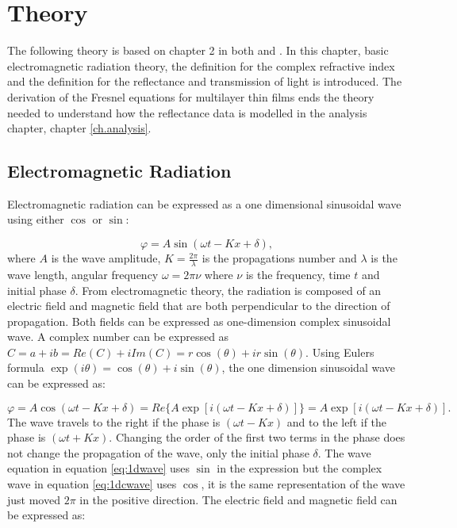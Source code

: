 \documentclass[MasterThesisMain.tex]{subfiles}
\begin{document}
\chapter{Theory}\label{lighttheory}

The following theory is based on chapter 2 in both \cite{fujiwara2007spectroscopic} and \cite{tompkins2015spectroscopic}. In this chapter, basic electromagnetic radiation theory, the definition for the complex refractive index and the definition for the reflectance and transmission of light is introduced. The derivation of the Fresnel equations for multilayer thin films ends the theory needed to understand how the reflectance data is modelled in the analysis chapter, chapter \ref{ch.analysis}.

\section{Electromagnetic Radiation}
Electromagnetic radiation can be expressed as a one dimensional sinusoidal wave using either $\cos$ or $\sin$:

\begin{equation}\label{eq:1dwave}
\varphi = A\sin(\omega t - Kx +\delta),
\end{equation}
where $A$ is the wave amplitude, $K=\frac{2\pi}{\lambda}$ is the propagations number and $\lambda$ is the wave length, angular frequency $\omega = 2\pi\nu$ where $\nu$ is the frequency, time $t$ and initial phase $\delta$.
From electromagnetic theory, the radiation is composed of an electric field and magnetic field that are both perpendicular to the direction of propagation. Both fields can be expressed as one-dimension complex sinusoidal wave. A complex number can be expressed as $C= a + ib =Re(C) + i Im(C) =r\cos(\theta)+ir\sin(\theta)$. Using Eulers formula $\exp(i\theta)=\cos(\theta)+i\sin(\theta)$, the one dimension sinusoidal wave can be expressed as:

\begin{equation}\label{eq:1dcwave}
\varphi=A\cos(\omega t- Kx +\delta) = Re \{A\exp[i(\omega t- Kx +\delta)]\} = A\exp[i(\omega t - Kx + \delta)]. 
\end{equation}
The wave travels to the right if the phase is $(\omega t - Kx)$ and to the left if the phase is $(\omega t + Kx)$. Changing the order of the first two terms in the phase does not change the propagation of the wave, only the initial phase $\delta$. The wave equation in equation \ref{eq:1dwave} uses $\sin$ in the expression but the complex wave in equation \ref{eq:1dcwave} uses $\cos$, it is the same representation of the wave just moved $2\pi$ in the positive direction. The electric field and magnetic field can be expressed as:
\end{document}
